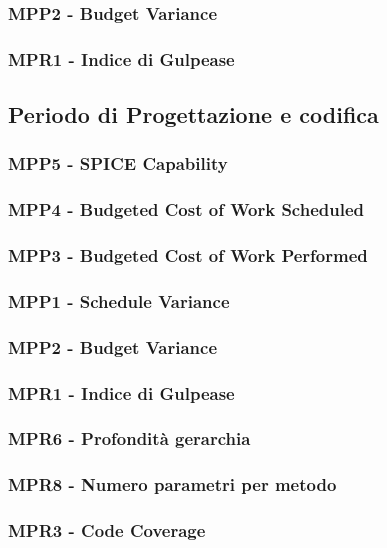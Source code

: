 \subsubsection{MPP2 - Budget Variance}
\subsubsection{MPR1 - Indice di Gulpease}

\subsection{Periodo di Progettazione e codifica}
\subsubsection{MPP5 - SPICE Capability}
\subsubsection{MPP4 - Budgeted Cost of Work Scheduled}
\subsubsection{MPP3 - Budgeted Cost of Work Performed}
\subsubsection{MPP1 - Schedule Variance}
\subsubsection{MPP2 - Budget Variance}
\subsubsection{MPR1 - Indice di Gulpease}
\subsubsection{MPR6 - Profondità gerarchia}
\subsubsection{MPR8 - Numero parametri per metodo}
\subsubsection{MPR3 - Code Coverage}
